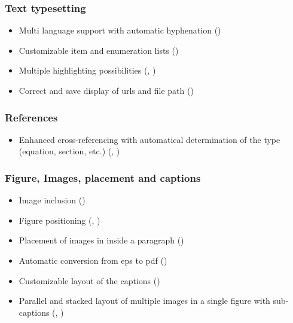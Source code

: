 \subsubsection*{Text typesetting}
\begin{itemize}
\item Multi language support with automatic hyphenation ()
%
\item Customizable item and enumeration lists ()
%
\item Multiple highlighting possibilities (, )
%
\item Correct and save display of urls and file path ()
\end{itemize}


\subsubsection*{References}
\begin{itemize}
\item Enhanced cross-referencing with automatical determination of the type (equation, section, etc.) (, )
\end{itemize}


\subsubsection*{Figure, Images, placement and captions}
\begin{itemize}
%
\item Image inclusion ()
\item Figure positioning (, )
\item Placement of images in inside a paragraph ()
\item Automatic conversion from eps to pdf ()
\item Customizable layout of the captions ()
\item Parallel and stacked layout of multiple images in a single figure with sub-captions (, )
%
\end{itemize}

